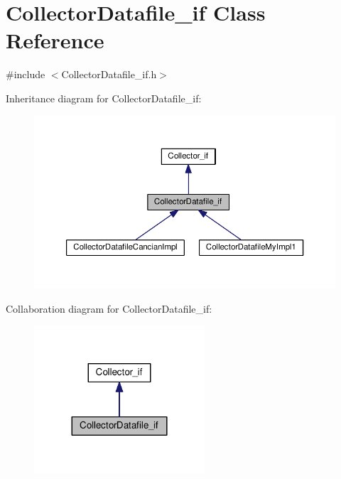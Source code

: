 \hypertarget{class_collector_datafile__if}{\section{Collector\-Datafile\-\_\-if Class Reference}
\label{class_collector_datafile__if}
}


{\ttfamily \#include $<$Collector\-Datafile\-\_\-if.\-h$>$}



Inheritance diagram for Collector\-Datafile\-\_\-if\-:
\nopagebreak
\begin{figure}[H]
\begin{center}
\leavevmode
\includegraphics[width=350pt]{class_collector_datafile__if__inherit__graph}
\end{center}
\end{figure}


Collaboration diagram for Collector\-Datafile\-\_\-if\-:\nopagebreak
\begin{figure}[H]
\begin{center}
\leavevmode
\includegraphics[width=180pt]{class_collector_datafile__if__coll__graph}
\end{center}
\end{figure}
